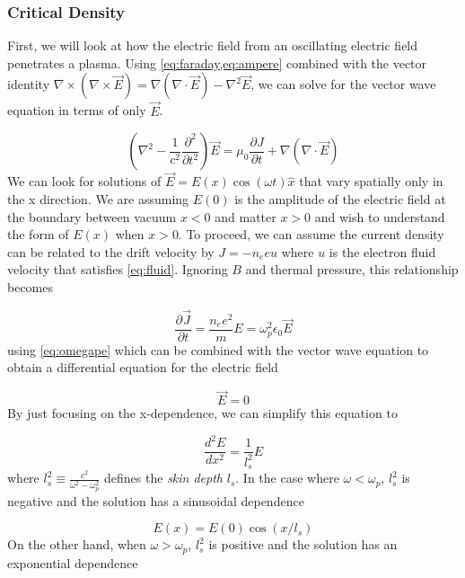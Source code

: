 \subsubsection{Critical Density}
First, we will look at how the electric field from an oscillating electric field penetrates a plasma. Using \cref{eq:faraday,eq:ampere} combined with the vector identity $\nabla \times (\nabla \times \vec{E}) = \nabla(\nabla \cdot \vec{E}) - \nabla^2 \vec{E}$\cite{Zangwill_2012}, we can solve for the vector wave equation in terms of only $\vec{E}$. 

\begin{equation}
	(\nabla^2 - \frac{1}{c^2} \frac{\partial^2}{\partial t^2}) \vec{E} = \mu_0 \frac{\partial J}{\partial t} + \nabla(\nabla \cdot \vec{E})
\end{equation}
We can look for solutions of $\vec{E} = E(x) \cos(\omega t) \hat{x}$ that vary spatially only in the x direction. We are assuming $E(0)$ is the amplitude of the electric field at the boundary between vacuum $x < 0$ and matter $x > 0$ and wish to understand the form of $E(x)$ when $x > 0$. To proceed, we can assume the current density can be related to the drift velocity\cite{Macchi_2013_Plasma} by $J = -n_e e u$ where $u$ is the electron fluid velocity that satisfies \cref{eq:fluid}. Ignoring $B$ and thermal pressure, this relationship becomes 

\begin{equation}
	\frac{\partial \vec{J}}{\partial t} = \frac{n_e e^2}{m} E = \omega_p^2 \epsilon_0 \vec{E}
\end{equation}
using \cref{eq:omegape} which can be combined with the vector wave equation to obtain a differential equation for the electric field

\begin{equation}
	[\nabla^2 + \frac{\omega^2}{c^2}(1 - \frac{\omega_p^2}{\omega^2})] \vec{E} = 0
\end{equation}
By just focusing on the x-dependence, we can simplify this equation to 

\begin{equation}
	\frac{d^2 E}{d x^2} = \frac{1}{l_s^2}  E
\end{equation}
where $l_s^2 \equiv \frac{c^2}{\omega^2 - \omega_p^2}$ defines the \emph{skin depth} $l_s$. In the case where $\omega < \omega_p$, $l_s^2$ is negative and the solution has a sinusoidal dependence

\begin{equation}
	E(x) = E(0) \cos(x / l_s)
\end{equation}
On the other hand, when $\omega > \omega_p$, $l_s^2$ is positive and the solution has an exponential dependence

